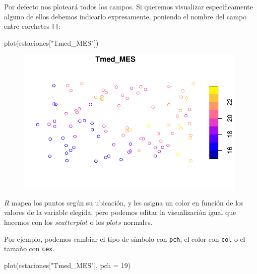 \documentclass[
  letterpaper,
  DIV=11,
  numbers=noendperiod]{scrreprt}
\newenvironment{Shaded}{\begin{snugshade}}{\end{snugshade}}
\newcommand{\AttributeTok}[1]{\textcolor[rgb]{0.40,0.45,0.13}{#1}}
\newcommand{\DecValTok}[1]{\textcolor[rgb]{0.68,0.00,0.00}{#1}}
\newcommand{\FunctionTok}[1]{\textcolor[rgb]{0.28,0.35,0.67}{#1}}
\newcommand{\NormalTok}[1]{\textcolor[rgb]{0.00,0.23,0.31}{#1}}
\newcommand{\StringTok}[1]{\textcolor[rgb]{0.13,0.47,0.30}{#1}}
\begin{document}
Por defecto nos ploteará todos los campos. Si queremos visualizar
específicamente alguno de ellos debemos indicarlo expresamente, poniendo
el nombre del campo entre corchetes \texttt{{[}{]}}:

\begin{Shaded}
\begin{Highlighting}[]
\FunctionTok{plot}\NormalTok{(estaciones[}\StringTok{"Tmed\_MES"}\NormalTok{])}
\end{Highlighting}
\end{Shaded}

\begin{figure}[H]

{\centering \includegraphics{03_DatosEspaciales_files/figure-pdf/unnamed-chunk-8-1.pdf}

}

\end{figure}

\(R\) mapea los puntos según su ubicación, y les asigna un color en
función de los valores de la variable elegida, pero podemos editar la
visualización igual que hacemos con los \(scatterplot\) o los \(plots\)
normales.

Por ejemplo, podemos cambiar el tipo de símbolo con \texttt{pch}, el
color con \texttt{col} o el tamaño con \texttt{cex}.

\begin{Shaded}
\begin{Highlighting}[]
\FunctionTok{plot}\NormalTok{(estaciones[}\StringTok{"Tmed\_MES"}\NormalTok{], }\AttributeTok{pch =} \DecValTok{19}\NormalTok{)}
\end{Highlighting}
\end{Shaded}
\end{document}
